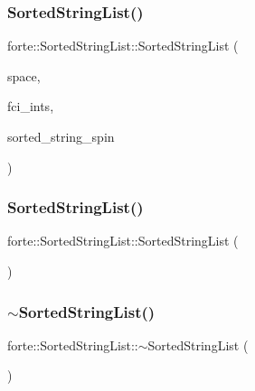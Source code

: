 \subsubsection{\texorpdfstring{Sorted\+String\+List()}{SortedStringList()}\hspace{0.1cm}{\footnotesize\ttfamily [1/2]}}
{\footnotesize\ttfamily forte\+::\+Sorted\+String\+List\+::\+Sorted\+String\+List (\begin{DoxyParamCaption}\item[{const \mbox{\hyperlink{classforte_1_1_determinant_hash_vec}{Determinant\+Hash\+Vec}} \&}]{space,  }\item[{std\+::shared\+\_\+ptr$<$ \mbox{\hyperlink{classforte_1_1_active_space_integrals}{Active\+Space\+Integrals}} $>$}]{fci\+\_\+ints,  }\item[{\mbox{\hyperlink{namespaceforte_acb88fa63430aae4a1b15c7be9c55f179}{Det\+Spin\+Type}}}]{sorted\+\_\+string\+\_\+spin }\end{DoxyParamCaption})}

\mbox{\label{classforte_1_1_sorted_string_list_a9e1f756811df1734ace863fe9edddb78}} 
\subsubsection{\texorpdfstring{Sorted\+String\+List()}{SortedStringList()}\hspace{0.1cm}{\footnotesize\ttfamily [2/2]}}
{\footnotesize\ttfamily forte\+::\+Sorted\+String\+List\+::\+Sorted\+String\+List (\begin{DoxyParamCaption}{ }\end{DoxyParamCaption})}

\mbox{\label{classforte_1_1_sorted_string_list_a5587d7d7bcf79b209a85f5dc144672d1}} 
\subsubsection{\texorpdfstring{$\sim$\+Sorted\+String\+List()}{~SortedStringList()}}
{\footnotesize\ttfamily forte\+::\+Sorted\+String\+List\+::$\sim$\+Sorted\+String\+List (\begin{DoxyParamCaption}{ }\end{DoxyParamCaption})}



